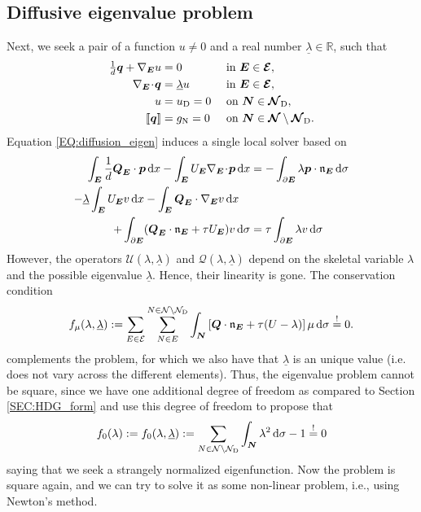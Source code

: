 \documentclass[a4paper, english, 12pt, reqno, draft]{amsart}
\theoremstyle{definition}
\theoremstyle{remark}
\numberwithin{equation}{section}
\newcommand{\setEdge}{\ensuremath{\mathcal E}}
\newcommand{\setNode}{\ensuremath{\mathcal N}}
\newcommand{\setNodeDir}{\ensuremath{\setNode_\textup D}}
\newcommand{\edge}{\ensuremath{E}}
\newcommand{\node}{\ensuremath{N}}
\newcommand{\SetEdge}{\ensuremath{\boldsymbol{\mathcal E}}}
\newcommand{\SetNode}{\ensuremath{\boldsymbol{\mathcal N}}}
\newcommand{\SetNodeDir}{\ensuremath{\SetNode_\textup D}}
\newcommand{\Edge}{{\ensuremath{\boldsymbol E}}}
\newcommand{\Node}{{\ensuremath{\boldsymbol N}}}
\newcommand{\Nabla}{\ensuremath{\nabla_\Edge}}
\newcommand{\Div}{\ensuremath{\Nabla\!\cdot\!}}
\newcommand{\Normal}{\ensuremath{\mathfrak n_\Edge}}
\newcommand{\jump}[1]{{[\![ #1 ]\!]}}
\newcommand{\IR}{\ensuremath{\mathbb R}}
\renewcommand{\vec}[1]{\ensuremath{\boldsymbol{#1}}}
\newcommand{\dx}{\ensuremath{\, \textup d x}}
\newcommand{\ds}{\ensuremath{\, \textup d \sigma}}
\newcommand{\localU}{\ensuremath{\mathcal U}}
\newcommand{\localQ}{\ensuremath{\vec{\mathcal Q}}}
\newcommand{\eigenval}{\ensuremath{\underline \lambda}}
\begin{document}
\subsection{Diffusive eigenvalue problem}
% 
Next, we seek a pair of a function  $u \neq 0$ and a real number $\eigenval \in \IR$, such that
% 
\begin{subequations}\label{EQ:diffusion_eigen}
\begin{align}
 \tfrac{1}{d} \vec q + \Nabla u & = 0 && \text{ in } \Edge \in \SetEdge,\\
 \Div \vec q & = \eigenval u && \text{ in } \Edge \in \SetEdge,\\
  u & = u_\textup D = 0 && \text{ on } \Node \in \SetNodeDir,\\
 \jump{\vec q} & = g_\textup N = 0 && \text{ on } \Node \in \SetNode \setminus \SetNodeDir.
\end{align}
\end{subequations}
% 
Equation \eqref{EQ:diffusion_eigen} induces a single local solver based on
% 
\begin{subequations}\label{EQ:hdg_scheme_eigen}
 \begin{align}
  \int_\Edge \frac{1}{d} \vec Q_\Edge \cdot \vec p \dx - \int_\Edge U_\Edge \Div \vec p \dx & = - \int_{\partial \Edge} \lambda \vec p \cdot \Normal \ds\\
  - \eigenval \int_\Edge U_\Edge v \dx - \int_\Edge \vec Q_\Edge \cdot \Nabla v \dx \quad \notag\\
  + \int_{\partial \Edge} ( \vec Q_\Edge \cdot \Normal + \tau  U_\Edge ) v \ds
  & = \tau \int_{\partial \Edge} \lambda v \ds
 \end{align}
\end{subequations}
% 
However, the operators $\localU(\lambda, \eigenval)$ and $\localQ(\lambda, \eigenval)$ depend on the skeletal variable $\lambda$ and the possible eigenvalue $\eigenval$. Hence, their linearity is gone. The conservation condition 
% 
\begin{equation*}
 f_\mu (\lambda,\eigenval) := \sum_{\edge \in \setEdge} \sum^{\node \in \setNode \setminus \setNodeDir}_{\node \in \edge} \int_\Node \left[ \vec Q \cdot \Normal + \tau (U - \lambda) \right] \mu \ds \overset{!}= 0.
\end{equation*}
% 
complements the problem, for which we also have that $\eigenval$ is an unique value (i.e. does not vary across the different elements). Thus, the eigenvalue problem cannot be square, since we have one additional degree of freedom as compared to Section \ref{SEC:HDG_form} and use this degree of freedom to propose that
% 
\begin{equation*}
 f_0(\lambda) := f_0 (\lambda,\eigenval) := \sum_{\node \in \setNode \setminus \setNodeDir} \int_\Node \lambda^2 \ds - 1 \overset{!}= 0
\end{equation*}
% 
saying that we seek a strangely normalized eigenfunction. Now the problem is square again, and we can try to solve it as some non-linear problem, i.e., using Newton's method.
\end{document}
